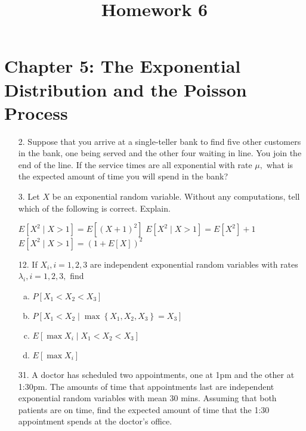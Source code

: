 \documentclass{article}
\begin{document}
\title{Homework 6}
\maketitle
\thispagestyle{fancy}

\section*{Chapter 5: The Exponential Distribution and the Poisson Process}

\begin{itemize}
	\item[2.] Suppose that you arrive at a single-teller bank to find five other customers in the bank, one being served and the other four waiting in line. You join the end of the line. If the service times are all exponential with rate $\mu,$ what is the expected amount of time you will spend in the bank?

	\item[3.] Let $X$ be an exponential random variable. Without any computations, tell which of the following is correct. Explain.
		\begin{enumerate}[(a)]
			\ii $E[X^2\mid X>1]=E[(X+1)^2]$ 
			\ii $E[X^2\mid X>1]=E[X^2]+1$
			\ii $E[X^2\mid X>1]=(1+E[X])^2$
		\end{enumerate}

	\item[12.] If $X_i, i=1, 2, 3$ are independent exponential random variables with rates $\lambda_i, i=1, 2, 3,$ find
		\begin{enumerate}[(a)]
			\item $P[X_1<X_2<X_3]$

			\item $P[X_1<X_2\mid \max\left\{ X_1, X_2, X_3 \right\}=X_3]$

			\item $E[\max X_i\mid X_1<X_2<X_3]$

			\item $E[\max X_i]$
				
		\end{enumerate}

	\item[31.] A doctor has scheduled two appointments, one at 1pm and the other at 1:30pm. The amounts of time that appointments last are independent exponential random variables with mean 30 mins. Assuming that both patients are on time, find the expected amount of time that the 1:30 appointment spends at the doctor's office.


\end{itemize}
\end{document}
